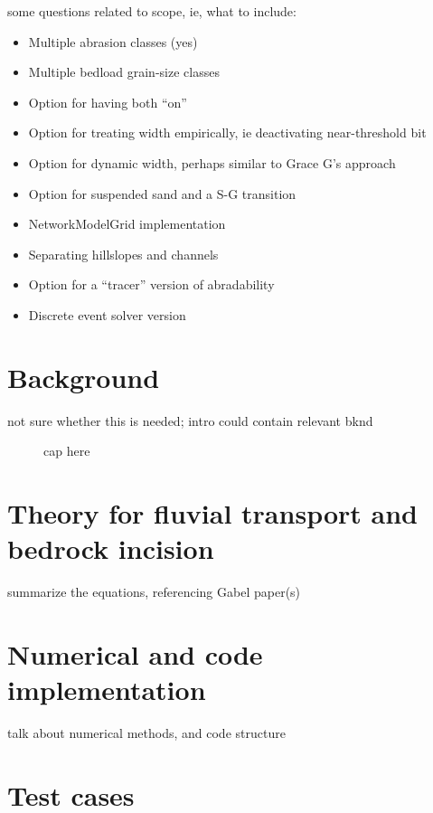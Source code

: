 \documentclass[journal abbreviation, manuscript]{copernicus}
\begin{document}
some questions related to scope, ie, what to include:
\begin{itemize}
    \item Multiple abrasion classes (yes)
    \item Multiple bedload grain-size classes
    \item Option for having both ``on''
    \item Option for treating width empirically, ie deactivating near-threshold bit
    \item Option for dynamic width, perhaps similar to Grace G's approach
    \item Option for suspended sand and a S-G transition
    \item NetworkModelGrid implementation
    \item Separating hillslopes and channels
    \item Option for a ``tracer'' version of abradability
    \item Discrete event solver version
\end{itemize}


\section{Background}
\label{sec:background}

not sure whether this is needed; intro could contain relevant bknd

\begin{figure}[h!]
\centering
\caption{cap here}
\label{fig:somefig}
\end{figure}



\section{Theory for fluvial transport and bedrock incision}

summarize the equations, referencing Gabel paper(s)

\section{Numerical and code implementation}

talk about numerical methods, and code structure

\section{Test cases}
\end{document}

